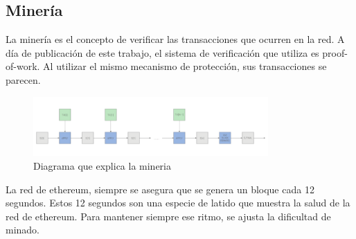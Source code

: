 \subsection{Minería}
La minería es el concepto de verificar las transacciones que ocurren en la red. A día de publicación de este trabajo, el sistema de verificación que utiliza es proof-of-work. Al utilizar el mismo mecanismo de protección, sus transacciones se parecen.
\begin{figure}[h!]
    \centering
    \includegraphics[width=0.8\textwidth]{Figures/Screenshot_20220507_131504.png}
    \caption{Diagrama que explica la mineria}
    \label{fg:block_diagram}
\end{figure}
La red de ethereum, siempre se asegura que se genera un bloque cada 12 segundos.
Estos 12 segundos son una especie de latido que muestra la salud de la red de ethereum. Para mantener siempre ese ritmo, se ajusta la dificultad de minado.
